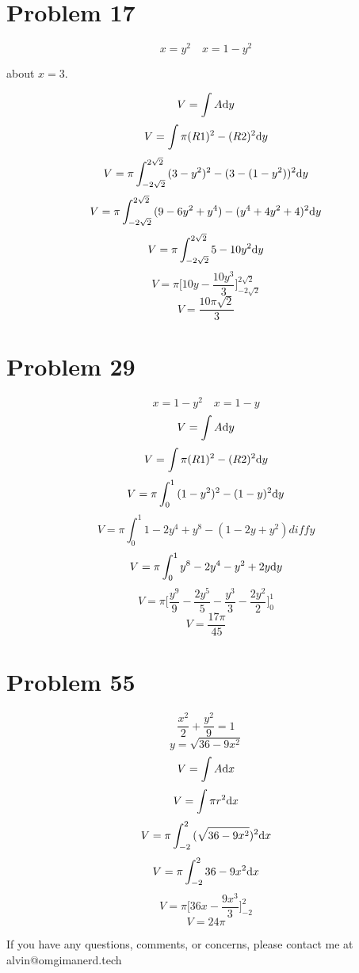 \documentclass[letterpaper, 12pt]{math}
\begin{document}
\section*{Problem 17}
\[ x = y^{2} \quad x = 1-y^{2} \]
\begin{center}
  about \( x = 3 \).
\end{center}
\[ V = \int{A\mathrm{d}{y}} \]
\[ V = \int{\pi(R1)^{2}-(R2)^{2}\mathrm{d}{y}} \]
\[ V = \pi\int_{-2\sqrt{2}}^{2\sqrt{2}}
       {(3-y^{2})^{2}-(3-(1-y^{2}))^{2}\mathrm{d}{y}} \]
\[ V = \pi\int_{-2\sqrt{2}}^{2\sqrt{2}}
       {(9-6y^{2}+y^{4})-(y^{4}+4y^{2}+4)^{2}\mathrm{d}{y}} \]
\[ V = \pi\int_{-2\sqrt{2}}^{2\sqrt{2}}{5-10y^{2}\mathrm{d}{y}} \]
\[ V = \pi\bigg[10y-\frac{10y^{3}}{3}\bigg]_{-2\sqrt{2}}^{2\sqrt{2}} \]
\[ V = \frac{10\pi\sqrt{2}}{3} \]

\section*{Problem 29}
\[ x = 1-y^{2} \quad x=1-y \]
\[ V = \int{A\mathrm{d}{y}} \]
\[ V = \int{\pi(R1)^{2}-(R2)^{2}\mathrm{d}{y}} \]
\[ V = \pi\int_{0}^{1}{(1-y^{2})^{2}-(1-y)^{2}\mathrm{d}{y}} \]
\[ V = \pi\int_{0}^{1}{1-2y^{4}+y^{8}-(1-2y+y^{2})diff{y}} \]
\[ V = \pi\int_{0}^{1}{y^{8}-2y^{4}-y^{2}+2y\mathrm{d}{y}} \]
\[ V = \pi\bigg[\frac{y^{9}}{9}-\frac{2y^{5}}{5}-
       \frac{y^{3}}{3}-\frac{2y^{2}}{2}\bigg]_{0}^{1} \]
\[ V = \frac{17\pi}{45} \]

\section*{Problem 55}
\[ \frac{x^{2}}{2}+\frac{y^{2}}{9} = 1 \]
\[ y = \sqrt{36-9x^{2}} \]
\[ V = \int{A\mathrm{d}{x}} \]
\[ V = \int{\pi r^{2}\mathrm{d}{x}} \]
\[ V = \pi\int_{-2}^{2}{(\sqrt{36-9x^{2}})^{2}\mathrm{d}{x}} \]
\[ V = \pi\int_{-2}^{2}{36-9x^{2}\mathrm{d}{x}} \]
\[ V = \pi\bigg[36x-\frac{9x^{3}}{3}\bigg]_{-2}^{2} \]
\[ V = 24\pi \]

\begin{center}
  If you have any questions, comments, or concerns, please contact me at
  alvin@omgimanerd.tech
\end{center}
\end{document}
